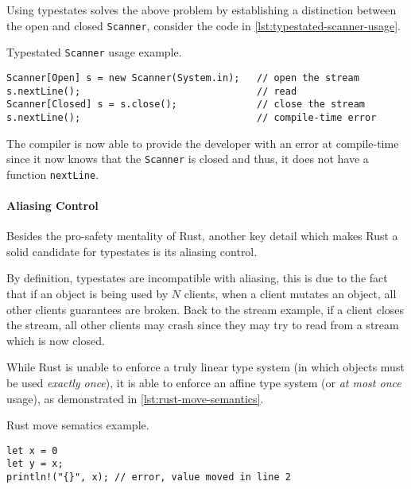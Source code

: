 \documentclass[a4paper, 10pt]{article}
\newenvironment{code}{\captionsetup{type=listing}}{}
\begin{document}
Using typestates solves the above problem by establishing a distinction between the open and closed \texttt{Scanner},
consider the code in \autoref{lst:typestated-scanner-usage}.

\begin{code}
    \caption{Typestated \texttt{Scanner} usage example.}
    \label{lst:typestated-scanner-usage}
    \begin{verbatim}
Scanner[Open] s = new Scanner(System.in);   // open the stream
s.nextLine();                               // read
Scanner[Closed] s = s.close();              // close the stream
s.nextLine();                               // compile-time error
    \end{verbatim}
\end{code}

The compiler is now able to provide the developer with an error at compile-time
since it now knows that the \texttt{Scanner} is closed and thus,
it does not have a function \texttt{nextLine}.

\paragraph{Aliasing Control}

Besides the pro-safety mentality of Rust,
another key detail which makes Rust a solid candidate for typestates is its aliasing control.

By definition, typestates are incompatible with aliasing,
this is due to the fact that if an object is being used by $N$ clients,
when a client mutates an object, all other clients guarantees are broken.
Back to the stream example, if a client closes the stream,
all other clients may crash since they may try to read from a stream which is now closed.

While Rust is unable to enforce a truly linear type system (in which objects must be used \emph{exactly once}),
it is able to enforce an affine type system (or \emph{at most once} usage), as demonstrated in \autoref{lst:rust-move-semantics}.


\begin{code}
    \caption{Rust move sematics example.}
    \label{lst:rust-move-semantics}
    \begin{verbatim}
let x = 0
let y = x;
println!("{}", x); // error, value moved in line 2
    \end{verbatim}
\end{code}
\end{document}
